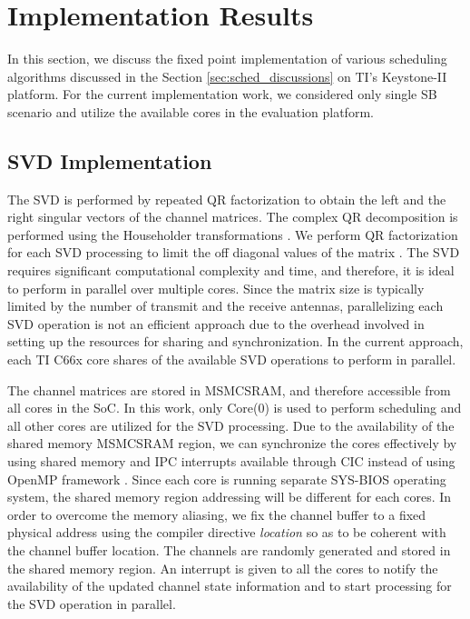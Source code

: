 \documentclass[conference,letterpaper]{./../../IEEE/IEEEtran}
\begin{document}
\section{Implementation Results}
\label{sec:implementation}
In this section, we discuss the fixed point implementation of various scheduling algorithms discussed in the Section \ref{sec:sched_discussions} on TI's Keystone-II platform. For the current implementation work, we considered only single SB scenario and utilize the available  cores in the evaluation platform. 

\subsection{SVD Implementation}
The SVD is performed by repeated QR factorization to obtain the left and the right singular vectors of the channel matrices. The complex QR decomposition is performed using the Householder transformations \cite{aft}. We perform  QR factorization for each SVD processing to limit the off diagonal values of the  matrix . The SVD requires significant computational complexity and time, and therefore, it is ideal to perform in parallel over multiple cores. Since the matrix size is typically limited by the number of transmit and the receive antennas, parallelizing each SVD operation is not an efficient approach due to the overhead involved in setting up the resources for sharing and synchronization. In the current approach, each TI C66x core shares  of the available SVD operations to perform in parallel.
	
The channel matrices are stored in \ac{MSMCSRAM}, and therefore accessible from all cores in the \ac{SoC}. In this work, only Core(0) is used to perform scheduling and all other cores are utilized for the SVD processing. Due to the availability of the shared memory \ac{MSMCSRAM} region, we can synchronize the cores effectively by using shared memory and \ac{IPC} interrupts available through \ac{CIC} instead of using OpenMP framework \cite{openmp,ipc,cic}. Since each core is running separate SYS-BIOS operating system, the shared memory region addressing will be different for each cores. In order to overcome the memory aliasing, we fix the channel buffer to a fixed physical address using the compiler directive \textit{location} so as to be coherent with the channel buffer location. The channels are randomly generated and stored in the shared memory region. An interrupt is given to all the cores to notify the availability of the updated channel state information and to start processing for the SVD operation in parallel.
\end{document}
